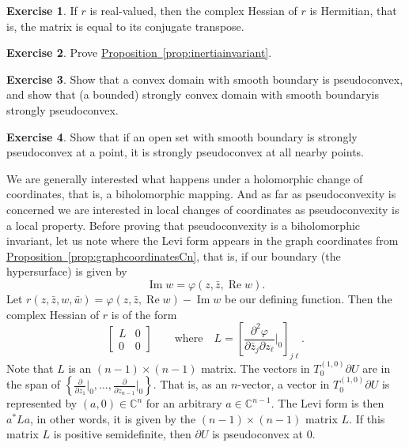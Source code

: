\documentclass[12pt,openany]{book}
\renewcommand{\Re}{\operatorname{Re}}
\renewcommand{\Im}{\operatorname{Im}}
\newcommand{\C}{{\mathbb{C}}}
\theoremstyle{plain}
\theoremstyle{remark}
\theoremstyle{definition}
\newenvironment{exbox}{%
    \def\FrameCommand{\vrule width 1pt \relax\hspace {10pt}}%
    \MakeFramed {\advance \hsize -\width \FrameRestore }%
}{%
    \endMakeFramed
}
\theoremstyle{exercise}
\newtheorem{exercise}{Exercise}[section]
\theoremstyle{example}
\newcommand{\propref}[1]{\hyperref[#1]{Proposition~\ref*{#1}}}
\begin{document}
\begin{exbox}
\begin{exercise}
If $r$ is real-valued, then the complex Hessian of $r$ is Hermitian, that
is, the matrix is equal to its conjugate transpose.
\end{exercise}

\begin{exercise}
Prove \propref{prop:inertiainvariant}.
\end{exercise}

\begin{exercise}
Show that a convex domain with smooth boundary
is pseudoconvex, and show that (a bounded) strongly convex
domain with smooth boundaryis strongly pseudoconvex.
\end{exercise}

\begin{exercise}
Show that if an open set with smooth boundary is strongly pseudoconvex at a point, it is strongly
pseudoconvex at all nearby points.
\end{exercise}
\end{exbox}

We are generally interested what happens under a holomorphic change of
coordinates, that is, a biholomorphic mapping.  And as far as pseudoconvexity
is concerned we are interested in local changes of coordinates as
pseudoconvexity is a local property.  Before proving 
that pseudoconvexity is a biholomorphic invariant, let us note where the
Levi form appears in the graph coordinates from 
\propref{prop:graphcoordinatesCn}, that is, if our boundary (the
hypersurface) is given by
\begin{equation*}
\Im w = \varphi(z,\bar{z},\Re w) .
\end{equation*}
Let $r(z,\bar{z},w,\bar{w}) = \varphi(z,\bar{z},\Re w) - \Im w$ be our
defining function.  Then the complex Hessian of $r$ is of the form
\begin{equation*}
\begin{bmatrix}
L & 0 \\
0 & 0
\end{bmatrix}
\qquad \text{where} \quad
L = \left[
\frac{\partial^2 \varphi}{\partial \bar{z}_j \partial z_{\ell}}\Big|_0
\right]_{j \ell} .
\end{equation*}
Note that $L$ is an $(n-1) \times (n-1)$ matrix.
The vectors in $T_0^{(1,0)} \partial U$ are in the span
of $\left\{
\frac{\partial}{\partial z_1}\big|_0,
\ldots,
\frac{\partial}{\partial z_{n-1}}\big|_0 \right\}$.
That is, as an $n$-vector,
a vector in $T_0^{(1,0)} \partial U$ is represented by $(a,0) \in \C^n$ for an
arbitrary $a \in \C^{n-1}$.  The Levi form is then $a^* L a$,
in other words, it is given by the $(n-1) \times (n-1)$ matrix $L$.
If this matrix $L$ is positive
semidefinite, then $\partial U$ is pseudoconvex at $0$.
\end{document}
